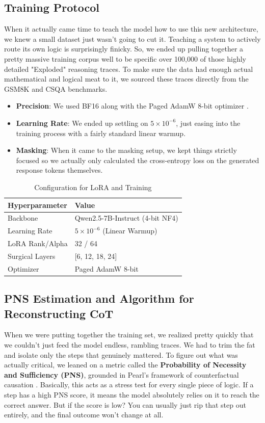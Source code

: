\documentclass[conference,compsoc]{IEEEtran}
\begin{document}
\subsection{Training Protocol}
When it actually came time to teach the model how to use this new architecture, we knew a small dataset just wasn't going to cut it. Teaching a system to actively route its own logic is surprisingly finicky. So, we ended up pulling together a pretty massive training corpus well to be specific over 100,000 of those highly detailed "Exploded" reasoning traces. To make sure the data had enough actual mathematical and logical meat to it, we sourced these traces directly from the GSM8K and CSQA benchmarks.
\begin{itemize}
    \item \textbf{Precision}: We used BF16 along with the Paged AdamW 8-bit optimizer \cite{b14}.
    \item \textbf{Learning Rate}: We ended up settling on $5 \times 10^{-6}$, just easing into the training process with a fairly standard linear warmup.
    \item \textbf{Masking}: When it came to the masking setup, we kept things strictly focused so we actually only calculated the cross-entropy loss on the generated response tokens themselves.
\end{itemize}

\begin{table}[htbp]
\caption{Configuration for LoRA and Training}
\label{tab:params}
\begin{center}
\begin{tabular}{ll}
\toprule
\textbf{Hyperparameter} & \textbf{Value} \\
\midrule
Backbone & Qwen2.5-7B-Instruct (4-bit NF4) \\
Learning Rate & $5 \times 10^{-6}$ (Linear Warmup) \\
LoRA Rank/Alpha & 32 / 64 \\
Surgical Layers & [6, 12, 18, 24] \\
Optimizer & Paged AdamW 8-bit \\
\bottomrule
\end{tabular}
\end{center}
\end{table}

\subsection{PNS Estimation and Algorithm for Reconstructing CoT}
When we were putting together the training set, we realized pretty quickly that we couldn't just feed the model endless, rambling traces. We had to trim the fat and isolate only the steps that genuinely mattered. To figure out what was actually critical, we leaned on a metric called the \textbf{Probability of Necessity and Sufficiency (PNS)}, grounded in Pearl's framework of counterfactual causation \cite{b16}. Basically, this acts as a stress test for every single piece of logic. If a step has a high PNS score, it means the model absolutely relies on it to reach the correct answer. But if the score is low? You can usually just rip that step out entirely, and the final outcome won't change at all.
\end{document}
